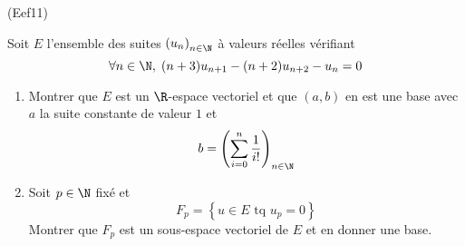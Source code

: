 \begin{tiny}(Eef11)\end{tiny} Soit $E$ l'ensemble des suites $\left( u_n\right)_{n\in \N}$ à valeurs réelles vérifiant
\begin{displaymath}
  \forall n\in \N, \; (n+3)u_{n+1} - (n+2)u_{n+2} - u_n = 0 
\end{displaymath}
\begin{enumerate}
  \item Montrer que $E$ est un $\R$-espace vectoriel et que $(a,b)$ en est une base avec $a$ la suite constante de valeur $1$ et
\begin{displaymath}
  b = \left( \sum_{i=0}^n \frac{1}{i!}\right)_{n\in \N}
\end{displaymath}
  \item Soit $p\in \N$ fixé et 
\begin{displaymath}
  F_p = \left\lbrace u\in E \text{ tq } u_p = 0\right\rbrace 
\end{displaymath}
Montrer que $F_p$ est un sous-espace vectoriel de $E$ et en donner une base.
\end{enumerate}